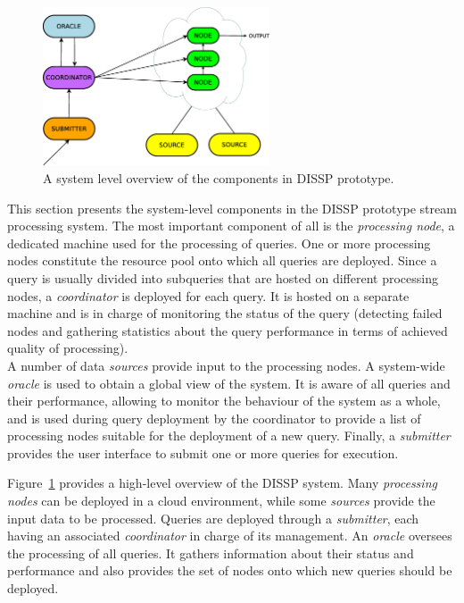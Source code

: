 \begin{figure}[b!]
	\centering
		\includegraphics[width=0.6\textwidth]{img/tesi/system_design} 
	\caption{A system level overview of the components in DISSP prototype. }
	\label{fig:sys}
\end{figure}
This section presents the system-level components in the DISSP prototype stream processing system. 
The most important component of all is the \emph{processing node}, a dedicated machine used for the
processing of queries. One or more processing nodes constitute the resource pool onto which all queries
are deployed. Since a query is usually divided into subqueries that are hosted on different processing
nodes, a \emph{coordinator} is deployed for each query. It is hosted on a separate machine and
is in charge of monitoring the status of the query (\ie detecting failed nodes and gathering statistics
about the query performance in terms of achieved quality of processing). \\
A number of data \emph{sources} provide input to the processing nodes. A system-wide \emph{oracle} is
used to obtain a global view of the system. It is aware of all queries and their performance, allowing
to monitor the behaviour of the system as a whole, and is used during query deployment by the
coordinator to provide a list of processing nodes suitable for the deployment of a new query. Finally, a \emph{submitter} provides the user interface to submit one or more queries for execution. 

Figure~\ref{fig:sys} provides a high-level overview of the DISSP system. Many \emph{processing
nodes} can be deployed in a cloud environment, while some \emph{sources} provide the input data to be
processed.
Queries are deployed through a \emph{submitter}, each having an associated \emph{coordinator} in charge
of its management. An \emph{oracle} oversees the processing of all queries. It gathers information
about their status and performance and also provides the set of nodes onto which new queries
should be deployed.
\vspace{-10pt}
